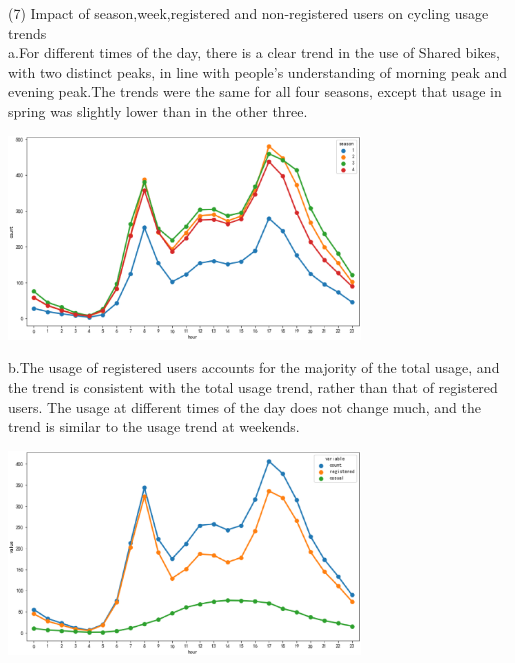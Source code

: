 (7) Impact of season,week,registered and non-registered users on cycling usage trends\\
    a.For different times of the day, there is a clear trend in the use of Shared bikes, with two distinct peaks, in line with people's understanding of morning peak and evening peak.The trends were the same for all four seasons, except that usage in spring was slightly lower than in the other three.
\begin{center}
  \begin{minipage}{1\linewidth}
    \centering
    \includegraphics[width=0.7\textwidth]{pic/three hour1 (2).eps}
  \end{minipage}
  
  
  \hfill
\end{center}
b.The usage of registered users accounts for the majority of the total usage, and the trend is consistent with the total usage trend, rather than that of registered users. The usage at different times of the day does not change much, and the trend is similar to the usage trend at weekends.
\begin{center}
  \begin{minipage}{1\linewidth}
    \centering
    \includegraphics[width=0.7\textwidth]{pic/three hour3.eps}
  \end{minipage}
  \hfill
\end{center}
 
